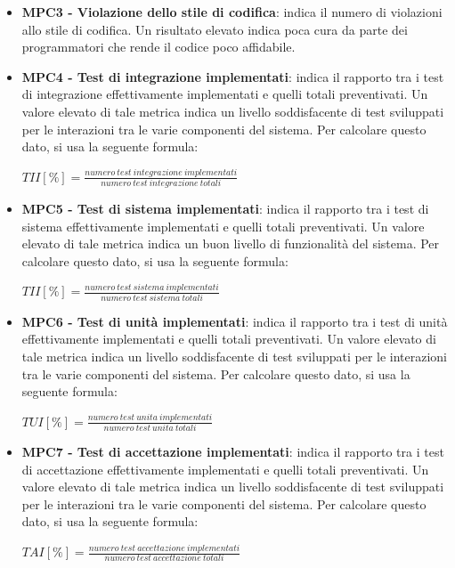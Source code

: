 \documentclass[11pt,a4paper]{article}
\begin{document}
{\begin{itemize}
	\item \textbf{MPC3 - Violazione dello stile di codifica}: indica il numero di violazioni allo stile di codifica. Un risultato elevato indica poca cura da parte dei programmatori che rende il codice poco affidabile. 
	
	\item \textbf{MPC4 - Test di integrazione implementati}: indica il rapporto tra i test di integrazione effettivamente implementati e quelli totali preventivati. Un valore elevato di tale metrica indica un livello soddisfacente di test sviluppati per le interazioni tra le varie componenti del sistema. Per calcolare questo dato, si usa la seguente formula: 
	\begin{center}
		$TII[\%]=\frac{numero\ test\ integrazione\ implementati}{numero\ test\ integrazione\ totali}$
	\end{center}
	
	\item \textbf{MPC5 - Test di sistema implementati}: indica il rapporto tra i test di sistema effettivamente implementati e quelli totali preventivati. Un valore elevato di tale metrica indica un buon livello di funzionalità del sistema. Per calcolare questo dato, si usa la seguente formula:
	\begin{center}
		$TII[\%]=\frac{numero\ test\ sistema\ implementati}{numero\ test\ sistema\ totali}$
	\end{center}

	\item \textbf{MPC6 - Test di unità implementati}: indica il rapporto tra i test di unità effettivamente implementati e quelli totali preventivati. Un valore elevato di tale metrica indica un livello soddisfacente di test sviluppati per le interazioni tra le varie componenti del sistema. Per calcolare questo dato, si usa la seguente formula: 
	\begin{center}
		$TUI[\%]=\frac{numero\ test\ unita\ implementati}{numero\ test\ unita\ totali}$
	\end{center}

	\item \textbf{MPC7 - Test di accettazione implementati}: indica il rapporto tra i test di accettazione effettivamente implementati e quelli totali preventivati. Un valore elevato di tale metrica indica un livello soddisfacente di test sviluppati per le interazioni tra le varie componenti del sistema. Per calcolare questo dato, si usa la seguente formula: 
	\begin{center}
		$TAI[\%]=\frac{numero\ test\ accettazione\ implementati}{numero\ test\ accettazione\ totali}$
	\end{center}


\end{itemize}}
\end{document}
